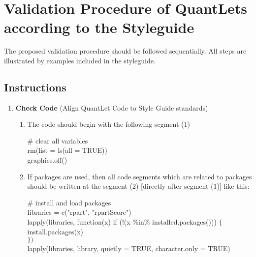 \documentclass{article}
\begin{document}
\section*{Validation Procedure of QuantLets according to the Styleguide}
The proposed validation procedure should be followed sequentially. All steps are illustrated by examples included in the styleguide.

\subsection*{Instructions} %
\begin{enumerate}[label*=\arabic*.]
	\item \textbf{Check Code} (Align QuantLet Code to Style Guide standards) 
	\begin {enumerate}[label*=\arabic*.]
		\item The code should begin with the following segment (1)
			\begin{mdframed}
				{$\#$ clear all variables
				\\rm(list = ls(all = TRUE))
				\\graphics.off() }
			\end{mdframed}												
		\item If packages are used, then all code segments which are related to packages should be written at the segment (2) [directly after segment (1)] like this:
			\begin{mdframed} {
				$\#$ install and load packages 
				\\libraries = c("rpart", "rpartScore") 
				\\lapply(libraries, function(x) if (!(x $\%$in$\%$ installed.packages())) $\{$
				\\ \hspace{2cm} install.packages(x)	
				\\ $\})$			
				\\ lapply(libraries, library, quietly = TRUE, character.only = TRUE)}
			\end{mdframed}						
		

\end{enumerate}
\end{enumerate}
\end{document}
